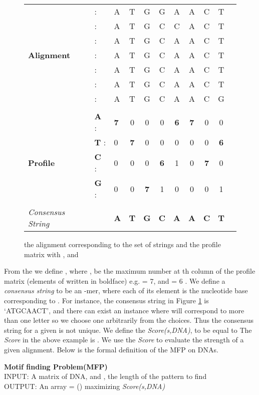 \documentclass{llncs}
\begin{document}
{\begin{figure}[h]
\begin{center}
\begin{small}
\begin{tabular}{l l l c c c c c c c c}
					&: 	&	A&T&G&G&A&A&C&T\\
					&:	&	A&T&G&C&C&A&C&T\\
					&:	&	A&T&G&C&A&A&C&T\\
\textbf{Alignment}	&	: &	A&T&G&C&A&A&C&T\\
					&	: &	A&T&G&C&A&A&C&T\\
					&: &	A&T&G&C&A&A&C&T\\
					&	: &	A&T&G&C&A&A&C&G\\
					\hline \\
					& \textbf{A}	: &	\textbf{7}&0&0&0&\textbf{6}&\textbf{7}&0&0 \\
					& \textbf{T}	: &	0&\textbf{7}&0&0&0&0&0&\textbf{6}\\
\textbf{Profile}	& \textbf{C}	: &	0&0&0&\textbf{6}&1&0&\textbf{7}&0\\
					& \textbf{G}	: &	0&0&\textbf{7}&1&0&0&0&1\\
					\hline \\
\textit{Consensus String}		&& \textbf{A} & \textbf{T} & \textbf{G} & \textbf{C}& \textbf{A} & \textbf{A}& \textbf{C}&\textbf{T} \\
					
\end{tabular}
\end{small}
\caption{the alignment   corresponding to the set of strings  and the  profile matrix  with , and }
\label{alignment-profile}
\end{center}
\end{figure}

From the  we define , where , be the maximum number at th column of the profile matrix (elements of   written in boldface) e.g.  = 7, and  = 6 .  We define a \textit{consensus string} to be an -mer, where each of its element is the nucleotide base corresponding to . For instance, the consensus string in Figure \ref{alignment-profile} is `ATGCAACT', and there can exist an instance where  will correspond to more than one letter so we choose one arbitrarily from the choices. Thus the consensus string for a given  is not unique. We define the \textit{Score(s,DNA)}, to be equal to  The \textit{Score} in the above example is . We use the \textit{Score} to evaluate the strength of a given alignment. Below is the formal definition of the MFP on DNAs.


\begin{definition} \label{mfpDefinition} \textbf{Motif finding Problem(MFP)} \\
\noindent INPUT: A  matrix of DNA, and , the length of the pattern to find\\
OUTPUT: An array = () maximizing \textit{Score(s,DNA)}
\end{definition}

}
\end{document}
